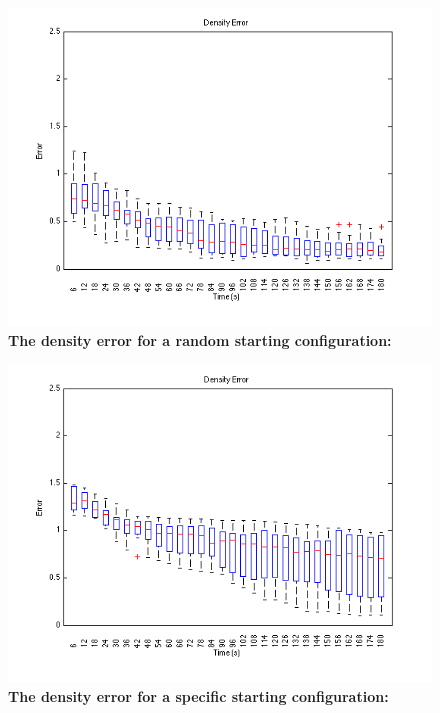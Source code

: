 \documentclass[oneside, a4paper, 12pt]{memoir}
\let\oldCaption\caption
\renewcommand{\caption}[2]{
\oldCaption[#1]{{\small\sffamily\bfseries #1:} #2}
}
\begin{document}
				
				\begin{figure}[!htp]
					\includegraphics[width=\textwidth]{../MATLAB/boxplot_random_density.png}
					\caption{The density error for a random starting configuration}{}
				\end{figure}
			
				
				\begin{figure}[!htp]
					\includegraphics[width=\textwidth]{../MATLAB/boxplot_geo2_density.png}
					\caption{The density error for a specific starting configuration}{}
				\end{figure}
				
\end{document}

